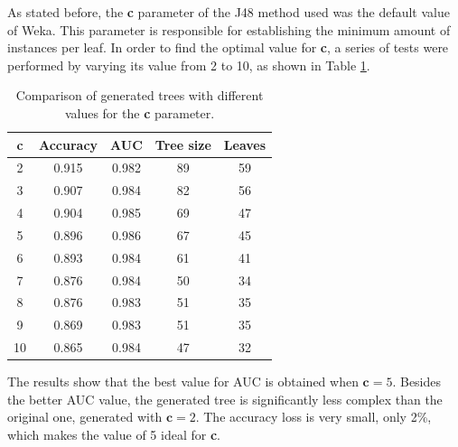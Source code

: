 \documentclass{article}
\begin{document}
As stated before, the \textbf{c} parameter of the J48 method used was the default value of Weka. This parameter is responsible for establishing the minimum amount of instances per leaf. In order to find the optimal value for \textbf{c}, a series of tests were performed by varying its value from 2 to 10, as shown in Table \ref{tab:c_optimal}.

\begin{table}[htp]
    \centering
    \begin{tabular}{c|c|c|c|c}
         \textbf{c} & Accuracy & AUC & Tree size & Leaves \\ \hline
         2 & 0.915 & 0.982 & 89 & 59 \\ 
         3 & 0.907 & 0.984 & 82 & 56 \\
         4 & 0.904 & 0.985 & 69 & 47 \\
         5 & 0.896 & 0.986 & 67 & 45 \\
         6 & 0.893 & 0.984 & 61 & 41 \\
         7 & 0.876 & 0.984 & 50 & 34 \\
         8 & 0.876 & 0.983 & 51 & 35 \\
         9 & 0.869 & 0.983 & 51 & 35 \\
         10 & 0.865 & 0.984 & 47 & 32 \\
    \end{tabular}
    \caption{Comparison of generated trees with different values for the \textbf{c} parameter.}
    \label{tab:c_optimal}
\end{table}

The results show that the best value for AUC is obtained when $\textbf{c} = 5$. Besides the better AUC value, the generated tree is significantly less complex than the original one, generated with $\textbf{c} = 2$. The accuracy loss is very small, only 2\%, which makes the value of 5 ideal for \textbf{c}.
\end{document}
